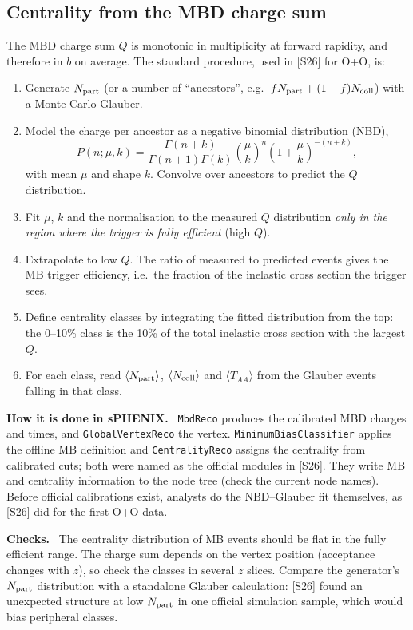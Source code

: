 \documentclass[11pt,letterpaper]{article}
\newcommand{\hd}[1]{\par\smallskip\noindent\textbf{\color{blue!50!black}#1.}\ }
\begin{document}
\subsection{Centrality from the MBD charge sum}
The MBD charge sum $Q$ is monotonic in multiplicity at forward rapidity, and therefore in $b$ on average. The standard procedure, used
in [S26] for O+O, is:
\begin{enumerate}
\item Generate $N_{\rm part}$ (or a number of ``ancestors'', e.g.\ $fN_{\rm part}+(1-f)N_{\rm coll}$) with a Monte Carlo Glauber.
\item Model the charge per ancestor as a negative binomial distribution (NBD),
\begin{equation}
P(n;\mu,k) = \frac{\Gamma(n+k)}{\Gamma(n+1)\Gamma(k)}\left(\frac{\mu}{k}\right)^{n}\left(1+\frac{\mu}{k}\right)^{-(n+k)} ,
\end{equation}
with mean $\mu$ and shape $k$. Convolve over ancestors to predict the $Q$ distribution.
\item Fit $\mu$, $k$ and the normalisation to the measured $Q$ distribution \emph{only in the region where the trigger is fully
efficient} (high $Q$).
\item Extrapolate to low $Q$. The ratio of measured to predicted events gives the MB trigger efficiency, i.e.\ the fraction of the
inelastic cross section the trigger sees.
\item Define centrality classes by integrating the fitted distribution from the top: the 0--10\% class is the 10\% of the total
inelastic cross section with the largest $Q$.
\item For each class, read $\langle N_{\rm part}\rangle$, $\langle N_{\rm coll}\rangle$ and $\langle T_{AA}\rangle$ from the Glauber
events falling in that class.
\end{enumerate}

\hd{How it is done in sPHENIX} \texttt{MbdReco} produces the calibrated MBD charges and times, and \texttt{GlobalVertexReco} the vertex.
\texttt{MinimumBiasClassifier} applies the offline MB definition and \texttt{CentralityReco} assigns the centrality from calibrated
cuts; both were named as the official modules in [S26]. They write MB and centrality information to the node tree (check the current
node names). Before official calibrations exist, analysts do the NBD--Glauber fit themselves, as [S26] did for the first O+O data.

\hd{Checks} The centrality distribution of MB events should be flat in the fully efficient range. The charge sum depends on the vertex
position (acceptance changes with $z$), so check the classes in several $z$ slices. Compare the generator's $N_{\rm part}$
distribution with a standalone Glauber calculation: [S26] found an unexpected structure at low $N_{\rm part}$ in one official
simulation sample, which would bias peripheral classes.
\end{document}
